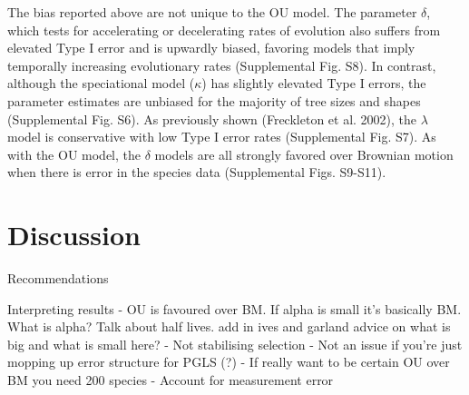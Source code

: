 \documentclass[a4paper,12pt]{article}
\begin{document}

The bias %
 reported above are not unique to the OU model. The parameter $\delta$, which tests for accelerating or decelerating rates of evolution \citep{Pagel:1997aa,Pagel:1999aa} also suffers from elevated Type I error and is upwardly biased, favoring models that imply temporally increasing evolutionary rates (Supplemental Fig. S8). In contrast, although the speciational model ($\kappa$) has slightly elevated Type I errors, the parameter estimates are unbiased for the majority of tree sizes and shapes (Supplemental Fig. S6). As previously shown (Freckleton et al. 2002), the $\lambda$ model is conservative with low Type I error rates (Supplemental Fig. S7). As with the OU model, the $\delta$ models are all strongly favored over Brownian motion when there is error in the species data (Supplemental Figs. S9-S11). 

\section{Discussion}
\label{section:discussion}

Recommendations

Interpreting results
 - OU is favoured over BM. If alpha is small it's basically BM. What
is alpha? Talk about half lives. add in ives and garland advice on what is big and what is small here?
 - Not stabilising selection
 - Not an issue if you're just mopping up error structure for PGLS (?)
 - If really want to be certain OU over BM you need 200 species
 - Account for measurement error

\end{document}
